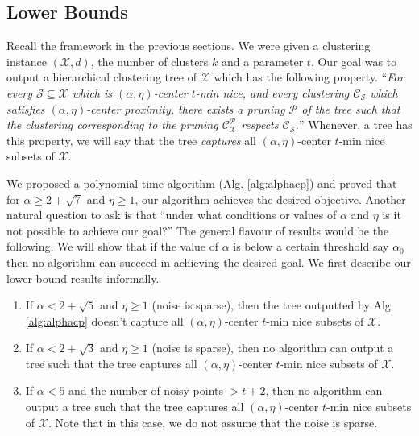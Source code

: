 \documentclass[11pt]{article}
\newcommand{\mc}{\mathcal}
\begin{document}
\subsection{Lower Bounds}
Recall the framework in the previous sections. We were given a clustering instance $(\mc X, d)$, the number of clusters $k$ and a parameter $t$. Our goal was to output a hierarchical clustering tree of $\mc X$ which has the following property. ``{\it For every $\mc S \subseteq \mc X$ which is $(\alpha, \eta)$-center $t$-min nice, and every clustering $\mc C_{\mc S}$ which satisfies $(\alpha, \eta)$-center proximity, there exists a pruning $\mc P$ of the tree such that the clustering corresponding to the pruning $\mc C_{\mc X}^{\mc P}$ respects $\mc C_{\mc S}$.}'' Whenever, a tree has this property, we will say that the tree {\it captures} all $(\alpha, \eta)$-center $t$-min nice subsets of $\mc X$.

We proposed a polynomial-time algorithm (Alg. \ref{alg:alphacp}) and proved that for $\alpha \ge 2+\sqrt 7$ and $\eta \ge 1$, our algorithm achieves the desired objective. Another natural question to ask is that ``under what conditions or values of $\alpha$ and $\eta$ is it not possible to achieve our goal?'' The general flavour of results would be the following. We will show that if the value of $\alpha$ is below a certain threshold say $\alpha_0$ then no algorithm can succeed in achieving the desired goal. We first describe our lower bound results informally.

\begin{enumerate}[nolistsep, noitemsep, label=\textbf{L.\arabic*}]
\renewcommand\labelitemi{$\diamond$}
\item \label{lowerBd:alphacp1} If $\alpha < 2 + \sqrt{5}$ and $\eta \ge 1$ (noise is sparse), then the tree outputted by Alg. \ref{alg:alphacp} doesn't capture all $(\alpha, \eta)$-center $t$-min nice subsets of $\mc X$. 
\item \label{lowerBd:alphacp2} If $\alpha < 2 + \sqrt{3}$ and $\eta \ge 1$ (noise is sparse), then no algorithm can output a tree such that the tree captures all $(\alpha, \eta)$-center $t$-min nice subsets of $\mc X$.
\item \label{lowerBd:alphacp3} If $\alpha < 5$ and the number of noisy points $ > t+2$, then no algorithm can output a tree such that the tree captures all $(\alpha, \eta)$-center $t$-min nice subsets of $\mc X$. Note that in this case, we do not assume that the noise is sparse.
\end{enumerate}
\end{document}
